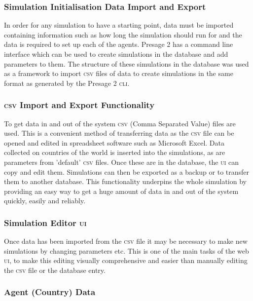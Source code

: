 \subsubsection{Simulation Initialisation Data Import and Export}

In order for any simulation to have a starting point, data must be imported containing information such as how long the simulation should run for and the data is required to set up each of the agents. Presage 2 has a command line interface which can be used to create simulations in the database and add parameters to them. The structure of these simulations in the database was used as a framework to import \textsc{csv} files of data to create simulations in the same format as generated by the Presage 2 \textsc{cli}.

\subsubsection{\textsc{csv} Import and Export Functionality}

To get data in and out of the system \textsc{csv} (Comma Separated Value) files are used. This is a convenient method of transferring data as the \textsc{csv} file can be opened and edited in spreadsheet software such as Microsoft Excel. Data collected on countries of the world is inserted into the simulations, as are parameters from 'default' \textsc{csv} files. Once these are in the database, the \textsc{ui} can copy and edit them. Simulations can then be exported as a backup or to transfer them to another database. This functionality underpins the whole simulation by providing an easy way to get a huge amount of data in and out of the system quickly, easily and reliably.

\subsubsection{Simulation Editor \textsc{ui}}

Once data has been imported from the \textsc{csv} file it may be necessary to make new simulations by changing parameters etc. This is one of the main tasks of the web \textsc{ui}, to make this editing visually comprehensive and easier than manually editing the \textsc{csv} file or the database entry.

\subsubsection{Agent (Country) Data}

